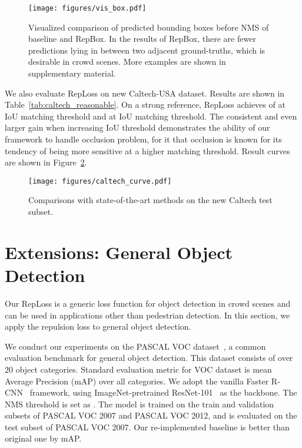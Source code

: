 \documentclass[10pt,twocolumn,letterpaper]{article}
\begin{document}
\begin{figure}[!tbp]
\centering
\texttt{[image: figures/vis\_box.pdf]}
\caption{Visualized comparison of predicted bounding boxes before NMS of baseline and RepBox. In the results of RepBox, there are fewer predictions lying in between two adjacent ground-truths, which is desirable in crowd scenes. More examples are shown in supplementary material.}
\vspace{-0.4cm}
\label{fig:vis_box}
\end{figure}

We also evaluate RepLoss on new Caltech-USA dataset. Results are shown in Table~\ref{tab:caltech_reasonable}. On a strong reference, RepLoss achieves  of  at  IoU matching threshold and  at  IoU matching threshold. The consistent and even larger gain when increasing IoU threshold demonstrates the ability of our framework to handle occlusion problem, for it that occlusion is known for its tendency of being more sensitive at a higher matching threshold. Result curves are shown in Figure~\ref{fig:caltech_curve}. 

\iffalse
\begin{figure}[t]
\centering
\texttt{[image: figures/caltech\_curve.pdf]}
\caption{Comparisons with state-of-the-art methods on the Caltech test set (reasonable subset) using new annotations.}
\vspace{-0.5cm}
\label{fig:caltech_curve}
\end{figure}
\fi

\begin{figure}[!t]
\centering
\texttt{[image: figures/caltech\_curve.pdf]}
\caption{Comparisons with state-of-the-art methods on the new Caltech test subset.}
\vspace{-0.6cm}
\label{fig:caltech_curve}
\end{figure}


\section{Extensions: General Object Detection}
Our RepLoss is a generic loss function for object detection in crowd scenes and can be used in applications other than pedestrian detection. In this section, we apply the repulsion loss to general object detection.

We conduct our experiments on the PASCAL VOC dataset~\cite{everingham2010pascal}, a common evaluation benchmark for general object detection. This dataset consists of over 20 object categories. Standard evaluation metric for VOC dataset is mean Average Precision (mAP) over all categories. We adopt the vanilla Faster R-CNN~\cite{NIPS2015_5638} framework, using ImageNet-pretrained ResNet-101~\cite{he2016deep} as the backbone. The NMS threshold is set as . The model is trained on the train and validation subsets of PASCAL VOC 2007 and PASCAL VOC 2012, and is evaluated on the test subset of PASCAL VOC 2007. Our re-implemented baseline is better than original one by  mAP.
\end{document}
